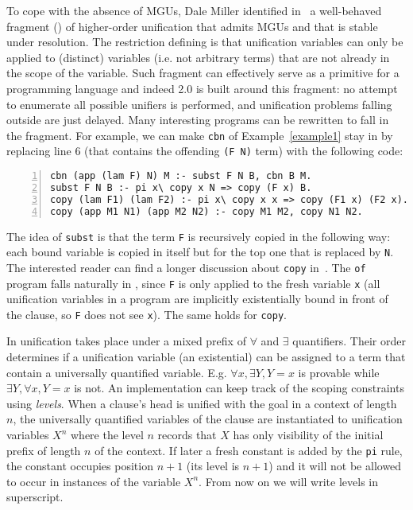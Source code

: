 \documentclass{llncs}
\begin{document}
To cope with the absence of MGUs, Dale Miller identified
in~\cite{Miller91alogic} a well-behaved fragment (\Ll{}) of higher-order
unification that admits MGUs and that is stable under \lp{} resolution. 
The restriction defining \Ll{} is that unification variables can
only be applied to (distinct) variables (i.e. not arbitrary terms) that are
not already in the scope of the variable.
Such fragment can effectively serve as a primitive for a
programming language and indeed \tedius{} 2.0 is built around this fragment:
no attempt to enumerate all possible unifiers is performed, and unification
problems falling outside \Ll{} are just delayed. Many interesting \lp{}
programs can be rewritten to fall in the fragment. For example, we can
make \verb+cbn+ of Example~\ref{example1} stay in \Ll{} by replacing
line 6 (that contains the offending \verb+(F N)+ term) with the following code:
\vspace{-0.4em}
\begin{center}
\small
\begin{minipage}{10cm}
\begin{Verbatim}[numbers=left,numbersep=1pt,frame=leftline]
cbn (app (lam F) N) M :- subst F N B, cbn B M.
subst F N B :- pi x\ copy x N => copy (F x) B.
copy (lam F1) (lam F2) :- pi x\ copy x x => copy (F1 x) (F2 x).
copy (app M1 N1) (app M2 N2) :- copy M1 M2, copy N1 N2.
\end{Verbatim}
\end{minipage}
\end{center}
\vspace{-0.3em}
The idea of \verb+subst+ is that the term \verb+F+ is recursively copied in
the following way: each bound variable is copied in itself but for the top one
that is replaced by \verb+N+.
The interested reader can find a longer discussion about \verb+copy+
in~\cite[page 199]{Miller:2012:PHL:2331097}.
The \verb+of+ program falls naturally in \Ll{}, since \verb+F+ is only applied
to 
the fresh variable \verb+x+ (all unification variables in a \lp{} program are
implicitly existentially bound in front of the clause, so \verb+F+ does not
see \verb+x+). The same holds for \verb+copy+.

In \lp{} unification takes place under
a mixed prefix of $\forall$ and $\exists$ quantifiers. Their order
determines if a unification variable (an existential) can be assigned to
a term that contain a universally quantified variable.
E.g. $\forall x,\exists Y, Y = x$ is provable while
$\exists Y,\forall x, Y = x$ is not. An implementation can
keep track of the scoping constraints using \emph{levels}.
When a clause's head is unified with the goal in a context of length
$n$, the universally quantified variables of the clause are instantiated to
unification variables $X^n$ where the level $n$ records that $X$ has only
visibility of the initial prefix of length $n$ of the context.
If later a fresh constant is added by the \verb+pi+ rule, the constant
occupies position $n+1$ (its level is $n+1$) and it will not be allowed to
occur in instances of the variable $X^n$.
From now on we will write levels in superscript.
\end{document}
